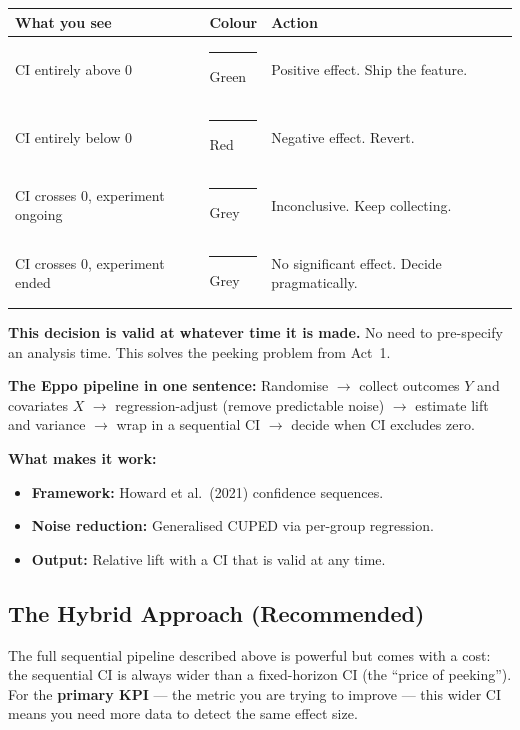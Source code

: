 \documentclass[12pt, a4paper]{article}
\begin{document}
\begin{center}
\renewcommand{\arraystretch}{1.3}
\begin{tabular}{@{} l l p{6.5cm} @{}}
\toprule
\textbf{What you see} & \textbf{Colour} & \textbf{Action} \\
\midrule
CI entirely above 0
  & \textcolor{green!60!black}{\rule{1em}{1em}} Green
  & Positive effect.  Ship the feature. \\
CI entirely below 0
  & \textcolor{red}{\rule{1em}{1em}} Red
  & Negative effect.  Revert. \\
CI crosses 0, experiment ongoing
  & \textcolor{gray}{\rule{1em}{1em}} Grey
  & Inconclusive.  Keep collecting. \\
CI crosses 0, experiment ended
  & \textcolor{gray}{\rule{1em}{1em}} Grey
  & No significant effect.  Decide pragmatically. \\
\bottomrule
\end{tabular}
\end{center}

\textbf{This decision is valid at whatever time it is made.}  No need to
pre-specify an analysis time.  This solves the peeking problem from Act~1.

\begin{keytakeaway}
\textbf{The Eppo pipeline in one sentence:}
Randomise $\to$ collect outcomes $Y$ and covariates $X$ $\to$
regression-adjust (remove predictable noise) $\to$ estimate lift and variance
$\to$ wrap in a sequential CI $\to$ decide when CI excludes zero.

\textbf{What makes it work:}
\begin{itemize}[nosep]
  \item \textbf{Framework:} Howard et al.\ (2021) confidence sequences.
  \item \textbf{Noise reduction:} Generalised CUPED via per-group regression.
  \item \textbf{Output:} Relative lift with a CI that is valid at any time.
\end{itemize}
\end{keytakeaway}


\subsection{The Hybrid Approach (Recommended)}

The full sequential pipeline described above is powerful but comes with a
cost: the sequential CI is always wider than a fixed-horizon CI (the ``price
of peeking'').  For the \textbf{primary KPI} --- the metric you are trying to
improve --- this wider CI means you need more data to detect the same effect
size.
\end{document}
